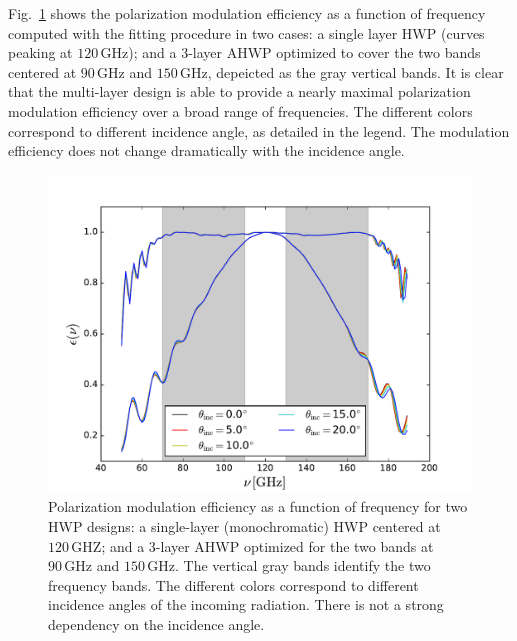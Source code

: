 Fig.~\ref{fig:eff} shows the polarization modulation efficiency as a function of frequency computed with the fitting procedure in two cases: a single layer HWP (curves peaking at $120\,\mathrm{GHz}$); and a 3-layer AHWP optimized to cover the two bands centered at $90\,\mathrm{GHz}$ and $150\,\mathrm{GHz}$, depeicted as the gray vertical bands. It is clear that the multi-layer design is able to provide a nearly maximal polarization modulation efficiency over a broad range of frequencies. 
The different colors correspond to different incidence angle, as detailed in the legend. The modulation efficiency does not change dramatically with the incidence angle.

\begin{figure}
\begin{center}
\includegraphics{figures/Eps_vs_nu_3l_PB2.pdf}
\end{center}
\caption{Polarization modulation efficiency as a function of frequency for two HWP designs: a single-layer (monochromatic) HWP centered at $120\,\mathrm{GHZ}$; and a 3-layer AHWP optimized for the two bands at $90\,\mathrm{GHz}$ and $150\,\mathrm{GHz}$. The vertical gray bands identify the two frequency bands. The different colors correspond to different incidence angles of the incoming radiation. There is not a strong dependency on the incidence angle.}\label{fig:eff}
\end{figure}

